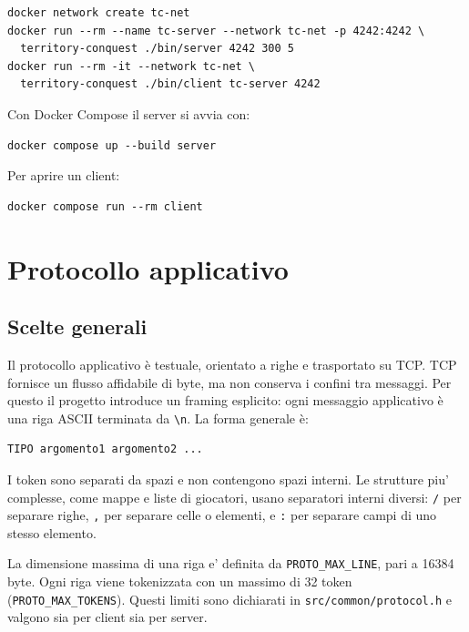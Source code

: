 \documentclass[11pt,a4paper]{article}
\begin{document}
\begin{lstlisting}[style=textstyle]
docker network create tc-net
docker run --rm --name tc-server --network tc-net -p 4242:4242 \
  territory-conquest ./bin/server 4242 300 5
docker run --rm -it --network tc-net \
  territory-conquest ./bin/client tc-server 4242
\end{lstlisting}

Con Docker Compose il server si avvia con:

\begin{lstlisting}[style=textstyle]
docker compose up --build server
\end{lstlisting}

Per aprire un client:

\begin{lstlisting}[style=textstyle]
docker compose run --rm client
\end{lstlisting}

\section{Protocollo applicativo}

\subsection{Scelte generali}

Il protocollo applicativo è testuale, orientato a righe e trasportato su TCP.
TCP fornisce un flusso affidabile di byte, ma non conserva i confini tra
messaggi. Per questo il progetto introduce un framing esplicito: ogni messaggio
applicativo è una riga ASCII terminata da \texttt{\textbackslash n}. La forma generale è:

\begin{lstlisting}[style=textstyle]
TIPO argomento1 argomento2 ...
\end{lstlisting}

I token sono separati da spazi e non contengono spazi interni. Le strutture piu'
complesse, come mappe e liste di giocatori, usano separatori interni diversi:
\texttt{/} per separare righe, \texttt{,} per separare celle o elementi, e
\texttt{:} per separare campi di uno stesso elemento.

La dimensione massima di una riga e' definita da \texttt{PROTO\_MAX\_LINE}, pari
a 16384 byte. Ogni riga viene tokenizzata con un massimo di 32 token
(\texttt{PROTO\_MAX\_TOKENS}). Questi limiti sono dichiarati in
\texttt{src/common/protocol.h} e valgono sia per client sia per server.
\newpage
\end{document}
